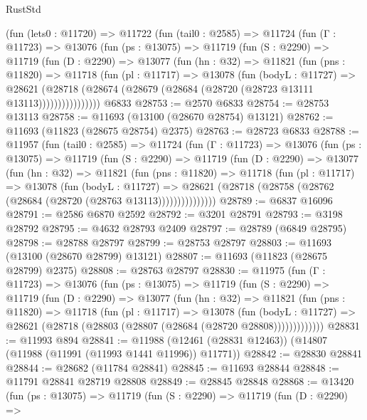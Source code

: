 \begin{lexlean}{RustStd}
\begin{coremodule}
    (fun (lets0 : @11720) =>
    @11722
      (fun (tail0 : @2585) =>
      @11724
        (fun (Γ : @11723) =>
        @13076
          (fun (ps : @13075) =>
          @11719
            (fun (S : @2290) =>
            @11719
              (fun (D : @2290) =>
              @13077
                (fun (hn : @32) =>
                @11821
                  (fun (pns : @11820) =>
                  @11718
                    (fun (pl : @11717) =>
                    @13078
                      (fun (bodyL : @11727) =>
                      @28621
                        (@28718
                          (@28674 (@28679 (@28684 (@28720 (@28723 @13111 @13113))))))))))))))))
    @6833
@28753 := @2570 @6833
@28754 := @28753 @13113
@28758 := @11693 (@13100 (@28670 @28754) @13121)
@28762 := @11693 (@11823 (@28675 @28754) @2375)
@28763 := @28723 @6833
@28788 := @11957
    (fun (tail0 : @2585) =>
    @11724
      (fun (Γ : @11723) =>
      @13076
        (fun (ps : @13075) =>
        @11719
          (fun (S : @2290) =>
          @11719
            (fun (D : @2290) =>
            @13077
              (fun (hn : @32) =>
              @11821
                (fun (pns : @11820) =>
                @11718
                  (fun (pl : @11717) =>
                  @13078
                    (fun (bodyL : @11727) =>
                    @28621 (@28718 (@28758 (@28762 (@28684 (@28720 (@28763 @13113)))))))))))))))
@28789 := @6837 @16096
@28791 := @2586 @6870 @2592
@28792 := @3201 @28791
@28793 := @3198 @28792
@28795 := @4632 @28793 @2409
@28797 := @28789 (@6849 @28795)
@28798 := @28788 @28797
@28799 := @28753 @28797
@28803 := @11693 (@13100 (@28670 @28799) @13121)
@28807 := @11693 (@11823 (@28675 @28799) @2375)
@28808 := @28763 @28797
@28830 := @11975
    (fun (Γ : @11723) =>
    @13076
      (fun (ps : @13075) =>
      @11719
        (fun (S : @2290) =>
        @11719
          (fun (D : @2290) =>
          @13077
            (fun (hn : @32) =>
            @11821
              (fun (pns : @11820) =>
              @11718
                (fun (pl : @11717) =>
                @13078
                  (fun (bodyL : @11727) =>
                  @28621 (@28718 (@28803 (@28807 (@28684 (@28720 @28808)))))))))))))
@28831 := @11993 @894
@28841 := @11988 (@12461 (@28831 @12463)) (@14807 (@11988 (@11991 (@11993 @1441 @11996)) @11771))
@28842 := @28830 @28841
@28844 := @28682 (@11784 @28841)
@28845 := @11693 @28844
@28848 := @11791 @28841 @28719 @28808
@28849 := @28845 @28848
@28868 := @13420
    (fun (ps : @13075) =>
    @11719
      (fun (S : @2290) =>
      @11719
        (fun (D : @2290) =>

\end{coremodule}
\end{lexlean}
